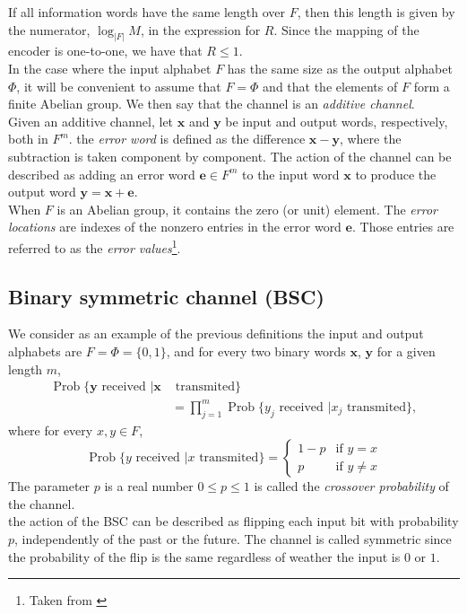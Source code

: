 If all information words have the same length over $F$, then this length is given by the numerator, $\log_{|F|}M$, in the expression for $R$. Since the mapping of the encoder is one-to-one, we have that $R\leq 1$.\\
In the case where the input alphabet $F$ has the same size as the output alphabet $\Phi$, it will be convenient to assume that $F=\Phi$ and that the elements of $F$ form a finite Abelian group. We then say that the channel is an \textit{additive channel}.\\
\indent Given an additive channel, let $\mathbf{x}$ and $\mathbf{y}$ be input and output words, respectively, both in $F^m$. the \textit{error word} is defined as the difference $\mathbf{x}-\mathbf{y}$, where the subtraction is taken component by component. The action of the channel can be described as adding an error word $\mathbf{e}\in F^m$ to the input word $\mathbf{x}$ to produce the output word $\mathbf{y} = \mathbf{x}+\mathbf{e}$.\\
\indent When $F$ is an Abelian group, it contains the zero (or unit) element. The \textit{error locations} are indexes of the nonzero entries in the error word $\mathbf{e}$. Those entries are referred to as the \textit{error values}\cite{roth_2006}\footnote{Taken from \cite{roth_2006}}.
\subsection{Binary symmetric channel (BSC)}
We consider as an example of the previous definitions the input and output alphabets are $F=\Phi=\{0,1\}$, and for every two binary words $\mathbf{x}$, $\mathbf{y}$ for a given length $m$, 
\begin{align}
\operatorname{Prob}\{\mathbf{y}\text{ received }|\mathbf{x}&\text{ transmited}\} \nonumber \\
&=\prod_{j=1}^{m} \operatorname{Prob}\{y_j\text{ received }|x_j\text{ transmited}\},
\end{align}
where for every $x,y\in F$,
\begin{equation}
\operatorname{Prob}\{y\text{ received }|x\text{ transmited}\} = \left\{
    \begin{array}{ll}
        1-p & \mbox{if } y=x \\
        p & \mbox{if } y\neq x
    \end{array}
\right.
\end{equation}
The parameter $p$ is a real number $0\leq p\leq 1$  is called the \textit{crossover probability} of the channel.\\
\indent the action of the BSC can be described as flipping each input bit with probability $p$, independently of the past or the future. The channel is called symmetric since the probability of the flip is the same regardless of weather the input is $0$ or $1$.
